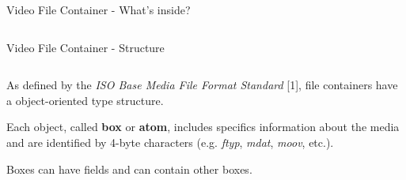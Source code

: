 \begin{tframe}{Video File Container - What's inside?}
\begin{minipage}{\textwidth}
\begin{columns}[T]
\end{columns}
\end{minipage}

\end{tframe}

\begin{tframe}{Video File Container - Structure}

\vspace{0.5cm}

\begin{minipage}{\textwidth}
\begin{columns}[T]

\begin{column}{0.55\textwidth}

As defined by the \emph{ISO Base Media File Format Standard} [1], file containers have a object-oriented type structure.

\vspace{0.5cm}

Each object, called \textbf{box} or \textbf{atom}, includes specifics information about the media and are identified by 4-byte characters (e.g. \emph{ftyp}, \emph{mdat}, \emph{moov}, etc.).

\vspace{0.5cm}

Boxes can have fields and can contain other boxes.

\end{column}


\end{columns}
\end{minipage}
\end{tframe}
